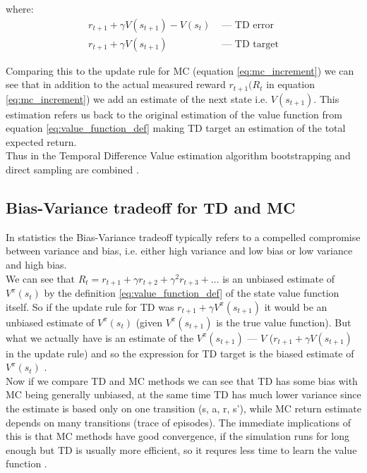 where:
\begin{align*}
  r_{t+1} + \gamma V(s_{t+1}) - V(s_t) &\text{ — } \text{TD error}\\
  r_{t+1} + \gamma V(s_{t+1}) &\text { — } \text{TD target}
\end{align*}

Comparing this to the update rule for MC (equation \ref{eq:mc_increment}) we can see that in addition to the actual measured reward $r_{t+1} (R_{t}$ in equation \ref{eq:mc_increment}) we add an estimate of the next state i.e. $V(s_{t+1})$. This estimation refers us back to the original estimation of the value function from equation \ref{eq:value_function_def} making TD target an estimation of the total expected return.\\

Thus in the Temporal Difference Value estimation algorithm
bootstrapping and direct sampling are combined \cite{lecture_mfl}. 

\subsection{Bias-Variance tradeoff for TD and MC}
In statistics the Bias-Variance tradeoff typically refers to 
a compelled compromise between variance and bias, i.e. either high variance and low bias or low variance and high bias. \\

We can see that $R_t = r_{t+1} + \gamma r_{t+2} + \gamma ^2 r_{t+3} + ...$ is an unbiased estimate of $V^{\pi} (s_t)$ by the definition \ref{eq:value_function_def} of the state value function itself. So if the update rule for TD was $r_{t+1} + \gamma V^{\pi}(s_{t+1})$ it would be an unbiased estimate of $V^{\pi}(s_{t})$ (given $V^{\pi}(s_{t+1})$ is the true value function). But what we actually have is an estimate of the $V^{\pi}(s_{t+1})$ — $V$ ($r_{t+1} + \gamma V(s_{t+1})$ in the update rule) and so the expression for TD target is the biased estimate of $V^{\pi}(s_t)$ \cite{lecture_mfl}. \\

Now if we compare TD and MC methods we can see that TD has some bias with MC being generally unbiased, at the same time TD has much lower variance since the estimate is based only on one transition (s, a, r, s'), while MC return estimate depends on many transitions (trace of episodes). The immediate implications of this is that MC methods have good convergence,
if the simulation runs for long enough but TD is usually more efficient, so it requres less time to learn the value function \cite{lecture_mfl}.

